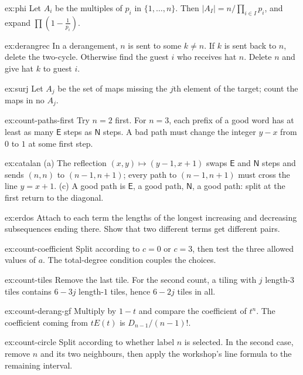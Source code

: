 \begin{hint}{ex:phi}
Let $A_i$ be the multiples of $p_i$ in $\{1,\dots,n\}$. Then $|A_I|=n/\prod_{i\in I}p_i$, and expand $\prod\left(1-\frac1{p_i}\right)$.
\end{hint}

\begin{hint}{ex:derangrec}
In a derangement, $n$ is sent to some $k\ne n$. If $k$ is sent back to $n$, delete the two-cycle. Otherwise find the guest $i$ who receives hat $n$. Delete $n$ and give hat $k$ to guest $i$.
\end{hint}

\begin{hint}{ex:surj}
Let $A_j$ be the set of maps missing the $j$th element of the target; count the maps in no $A_j$.
\end{hint}

\begin{hint}{ex:count-paths-first}
Try $n=2$ first. For $n=3$, each prefix of a good word has at
least as many $\mathsf E$ steps as $\mathsf N$ steps. A bad path
must change the integer $y-x$ from $0$ to $1$ at some first step.
\end{hint}

\begin{hint}{ex:catalan}
(a) The reflection $(x,y)\mapsto(y-1,x+1)$ swaps $\mathsf E$ and $\mathsf N$ steps and sends $(n,n)$ to $(n-1,n+1)$; every path to $(n-1,n+1)$ must cross the line $y=x+1$. (c) A good path is $\mathsf E$, a good path, $\mathsf N$, a good path: split at the first return to the diagonal.
\end{hint}

\begin{hint}{ex:erdos}
Attach to each term the lengths of the longest increasing and decreasing subsequences ending there. Show that two different terms get different pairs.
\end{hint}

\begin{hint}{ex:count-coefficient}
Split according to $c=0$ or $c=3$, then test the three allowed values of $a$. The total-degree condition couples the choices.
\end{hint}
\begin{hint}{ex:count-tiles}
Remove the last tile. For the second count, a tiling with $j$ length-$3$ tiles contains $6-3j$ length-$1$ tiles, hence $6-2j$ tiles in all.
\end{hint}
\begin{hint}{ex:count-derang-gf}
Multiply by $1-t$ and compare the coefficient of $t^n$. The coefficient coming from $tE(t)$ is $D_{n-1}/(n-1)!$.
\end{hint}
\begin{hint}{ex:count-circle}
Split according to whether label $n$ is selected. In the second case, remove $n$ and its two neighbours, then apply the workshop's line formula to the remaining interval.
\end{hint}

